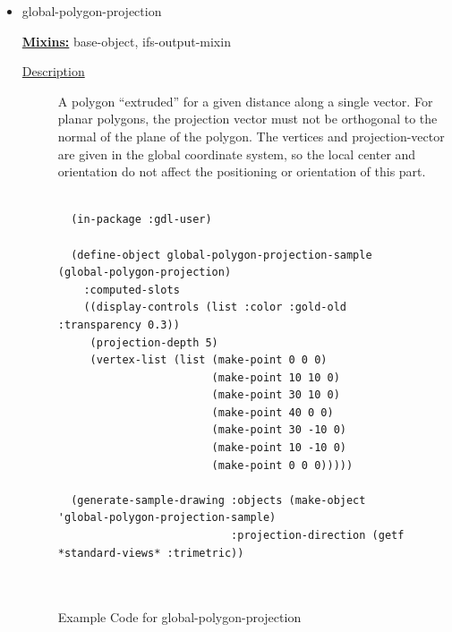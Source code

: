 \documentclass [11pt]{book}
\begin{document}
\begin{itemize}
\item {}global-polygon-projection


\textbf{
\underline{Mixins:}} base-object, ifs-output-mixin





\begin{description}

\item [
\underline{Description}]


A polygon ``extruded'' for a given distance along a single vector.
For planar polygons, the projection vector must not be orthogonal to the normal of the plane of
the polygon. The vertices and projection-vector are given in the global coordinate system, so
the local center and orientation do not affect the positioning or orientation of this part.



\end{description}




\begin{figure}
\begin{lrbox}{\boxedverb}
\begin{minipage}{\linewidth}
{\small

\begin{verbatim}

  (in-package :gdl-user)

  (define-object global-polygon-projection-sample (global-polygon-projection)
    :computed-slots
    ((display-controls (list :color :gold-old :transparency 0.3))
     (projection-depth 5)
     (vertex-list (list (make-point 0 0 0)
                        (make-point 10 10 0)
                        (make-point 30 10 0)
                        (make-point 40 0 0)
                        (make-point 30 -10 0)
                        (make-point 10 -10 0)
                        (make-point 0 0 0)))))

  (generate-sample-drawing :objects (make-object 'global-polygon-projection-sample)
                           :projection-direction (getf *standard-views* :trimetric))  

  
\end{verbatim}}
\end{minipage}
\end{lrbox}
\fbox{\usebox{\boxedverb}}

\caption{Example Code for global-polygon-projection}


\end{figure}
\end{itemize}
\end{document}
